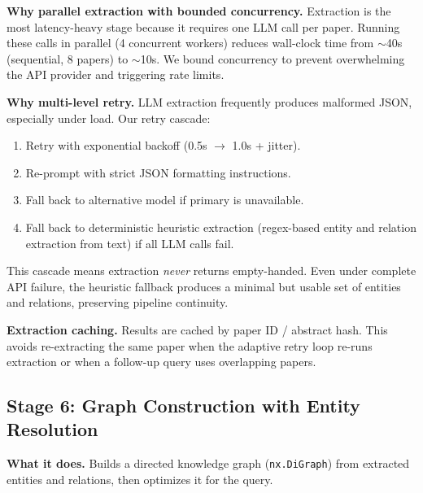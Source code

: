 \documentclass[11pt]{article}
\begin{document}
\textbf{Why parallel extraction with bounded concurrency.} Extraction is the most latency-heavy stage because it requires one LLM call per paper. Running these calls in parallel (4 concurrent workers) reduces wall-clock time from $\sim$40s (sequential, 8 papers) to $\sim$10s. We bound concurrency to prevent overwhelming the API provider and triggering rate limits.

\textbf{Why multi-level retry.} LLM extraction frequently produces malformed JSON, especially under load. Our retry cascade:
\begin{enumerate}[leftmargin=1.2em]
  \item Retry with exponential backoff (0.5s $\rightarrow$ 1.0s + jitter).
  \item Re-prompt with strict JSON formatting instructions.
  \item Fall back to alternative model if primary is unavailable.
  \item Fall back to deterministic heuristic extraction (regex-based entity and relation extraction from text) if all LLM calls fail.
\end{enumerate}
This cascade means extraction \emph{never} returns empty-handed. Even under complete API failure, the heuristic fallback produces a minimal but usable set of entities and relations, preserving pipeline continuity.

\textbf{Extraction caching.} Results are cached by paper ID / abstract hash. This avoids re-extracting the same paper when the adaptive retry loop re-runs extraction or when a follow-up query uses overlapping papers.

\subsection{Stage 6: Graph Construction with Entity Resolution}

\textbf{What it does.} Builds a directed knowledge graph (\texttt{nx.DiGraph}) from extracted entities and relations, then optimizes it for the query.
\end{document}
